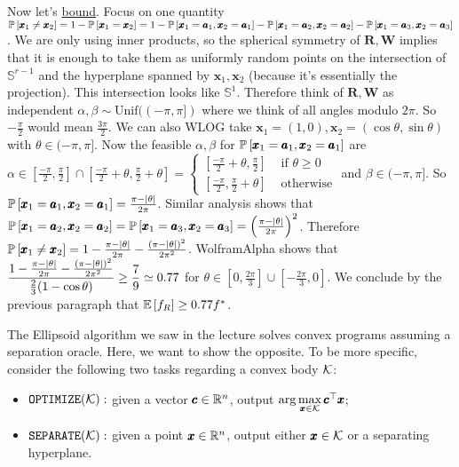 Now let's \underline{bound}. Focus on one quantity $\P{\pmb x_{1}\ne \pmb x_{2}} = 1-\P{\pmb x_{1}=\pmb x_{2}} = 1 - \P{\pmb x_{1}=\pmb a_{1},\pmb x_{2} = \pmb a_{1}} - \P{\pmb x_{1}=\pmb a_{2},\pmb x_{2} = \pmb a_{2}}-\P{\pmb x_{1}=\pmb a_{3},\pmb x_{2} = \pmb a_{3}}$. We are only using inner products, so the spherical symmetry of $\pmb R,\pmb W$ implies that it is enough to take them as uniformly random points on the intersection of $\mathbb S^{r-1}$ and the hyperplane spanned by $\pmb x_{1},\pmb x_{2}$ (because it's essentially the projection). This intersection looks like $\mathbb S^{1}$. Therefore think of $\pmb R,\pmb W$ as independent $\alpha,\beta \sim \text{Unif}((-\pi,\pi])$ where we think of all angles modulo $2\pi$. So $-\frac\pi2$ would mean $\frac{3\pi}{2}$. We can also WLOG take $\pmb x_{1}=(1,0),\pmb x_{2}=(\cos\theta,\sin\theta)$ with $\theta\in (-\pi,\pi]$. Now the feasible $\alpha,\beta$ for $\P{\pmb x_{1}=\pmb a_{1},\pmb x_{2} = \pmb a_{1}}$ are $\alpha\in \left[\frac{-\pi}{2},\frac{\pi}{2}\right] \cap \left[\frac{-\pi}{2}+\theta,\frac{\pi}{2}+\theta\right] = \begin{cases}\left[\frac{-\pi}{2}+\theta,\frac{\pi}{2}\right] & \text{ if } \theta\ge 0 \\
\left[\frac{-\pi}{2},\frac{\pi}{2}+\theta\right] & \text{ otherwise}
\end{cases}$ and $\beta\in (-\pi,\pi]$. So $\P{\pmb x_{1}=\pmb a_{1},\pmb x_{2} = \pmb a_{1}} = \frac{\pi-\abs \theta}{2\pi}$. Similar analysis shows that $\P{\pmb x_{1}=\pmb a_{2},\pmb x_{2} = \pmb a_{2}} = \P{\pmb x_{1}=\pmb a_{3},\pmb x_{2} = \pmb a_{3}} = \left(\frac{\pi-\abs\theta}{2\pi}\right)^{2}$. Therefore $\P{\pmb x_{1}\ne \pmb x_{2}} = 1 - \frac{\pi-\abs\theta}{2\pi} - \frac{(\pi-\abs\theta)^{2}}{2\pi^{2}}$. WolframAlpha shows that $\ds \frac{1 - \frac{\pi-\abs\theta}{2\pi} - \frac{(\pi-\abs\theta)^{2}}{2\pi^{2}}}{\frac23(1-\cos\theta)} \ge \frac{7}{9} \simeq 0.77$ for $\theta\in \left[0,\frac{2\pi}{3}\right]\cup\left[-\frac{2\pi}{3},0\right]$. We conclude by the previous paragraph that $\E{f_{R}}\ge 0.77 f^{*}$.








\newpage
\pb
The Ellipsoid algorithm we saw in the lecture solves convex programs assuming a separation oracle. Here, we want to show the opposite. To be more specific, consider the following two tasks regarding a convex body $\cK$:
\begin{itemize}
\item $\texttt{OPTIMIZE}(\cK):$ given a vector $\pmb c\in\R^{n}$, output $\arg\max\limits_{\pmb x\in\cK}\pmb c^{\top}\pmb x$;
\item $\texttt{SEPARATE}(\cK):$ given a point $\pmb x\in\R^{n}$, output either $\pmb x\in \cK$ or a separating hyperplane.
\end{itemize}

